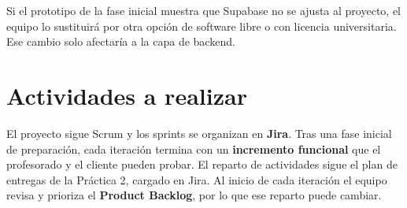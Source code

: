 \documentclass[11pt,a4paper]{article}
\newcommand{\hl}[1]{\textcolor{gblue}{\textbf{#1}}}
\begin{document}
Si el prototipo de la fase inicial muestra que Supabase no se ajusta al proyecto, el equipo lo sustituirá por otra opción de software libre o con licencia universitaria. Ese cambio solo afectaría a la capa de backend.



\clearpage
\section{Actividades a realizar}
El proyecto sigue Scrum y los sprints se organizan en \hl{Jira}. Tras una fase inicial de preparación, cada iteración termina con un \hl{incremento funcional} que el profesorado y el cliente pueden probar. El reparto de actividades sigue el plan de entregas de la Práctica 2, cargado en Jira. Al inicio de cada iteración el equipo revisa y prioriza el \hl{Product Backlog}, por lo que ese reparto puede cambiar.
\end{document}
